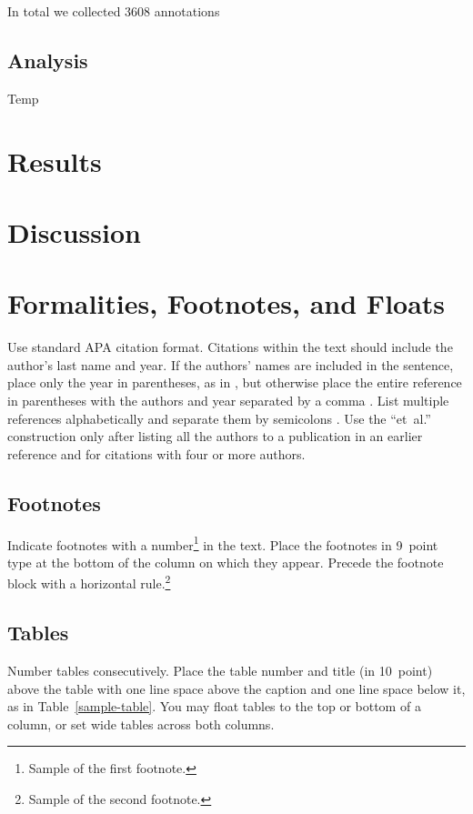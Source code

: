 \documentclass[10pt,letterpaper]{article}
\begin{document}
\noindent In total we collected 3608 annotations


\subsection{Analysis}

Temp

\section{Results}


\section{Discussion}

\section{Formalities, Footnotes, and Floats}

Use standard APA citation format. Citations within the text should
include the author's last name and year. If the authors' names are
included in the sentence, place only the year in parentheses, as in
, but otherwise place the entire reference in
parentheses with the authors and year separated by a comma
\cite{NewellSimon1972a}. List multiple references alphabetically and
separate them by semicolons
\cite{ChalnickBillman1988a,NewellSimon1972a}. Use the
``et~al.'' construction only after listing all the authors to a
publication in an earlier reference and for citations with four or
more authors.


\subsection{Footnotes}

Indicate footnotes with a number\footnote{Sample of the first
footnote.} in the text. Place the footnotes in 9~point type at the
bottom of the column on which they appear. Precede the footnote block
with a horizontal rule.\footnote{Sample of the second footnote.}


\subsection{Tables}

Number tables consecutively. Place the table number and title (in
10~point) above the table with one line space above the caption and
one line space below it, as in Table~\ref{sample-table}. You may float
tables to the top or bottom of a column, or set wide tables across
both columns.
\end{document}

